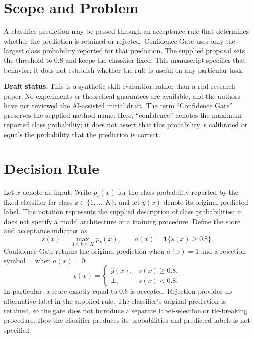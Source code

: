 \section{Scope and Problem}
\label{sec:scope}
A classifier prediction may be passed through an acceptance rule that determines
whether the prediction is retained or rejected. Confidence Gate uses only the
largest class probability reported for that prediction. The supplied proposal
sets the threshold to $0.8$ and keeps the classifier fixed. This manuscript
specifies that behavior; it does not establish whether the rule is useful on any
particular task.

\textbf{Draft status.} This is a synthetic skill evaluation rather than a real
research paper. No experiments or theoretical guarantees are available, and the
authors have not reviewed the AI-assisted initial draft. The term ``Confidence
Gate'' preserves the supplied method name. Here, ``confidence'' denotes the
maximum reported class probability; it does not assert that this probability is
calibrated or equals the probability that the prediction is correct.


\section{Decision Rule}
\label{sec:method}
Let $x$ denote an input. Write $p_k(x)$ for the class probability reported by the
fixed classifier for class $k\in\{1,\ldots,K\}$, and let $\widehat y(x)$ denote
its original predicted label. This notation represents the supplied description
of class probabilities; it does not specify a model architecture or a training
procedure. Define the score and acceptance indicator as
\begin{equation}
\label{eq:gate}
 s(x)=\max_{1\leq k\leq K} p_k(x),
 \qquad a(x)=\mathbf{1}\{s(x)\geq 0.8\}.
\end{equation}
Confidence Gate returns the original prediction when $a(x)=1$ and a rejection
symbol $\bot$ when $a(x)=0$:
\begin{equation}
\label{eq:output}
 g(x)=\begin{cases}
 \widehat y(x), & s(x)\geq 0.8,\\
 \bot, & s(x)<0.8.
 \end{cases}
\end{equation}
In particular, a score exactly equal to $0.8$ is accepted. Rejection provides no
alternative label in the supplied rule. The classifier's original prediction
is retained, so the gate does not introduce a separate label-selection or tie-breaking
procedure. How the classifier produces its probabilities and predicted labels
is not specified.

